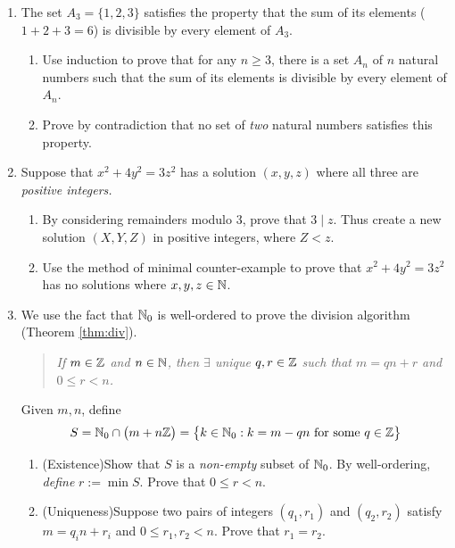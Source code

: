 \begin{exercises}
\begin{enumerate}
	
		\goodbreak
		
	
  	\item The set $A_3=\{1,2,3\}$ satisfies the property that the sum of its elements ($1+2+3=6$) is divisible by every element of $A_3$.
  	\begin{enumerate}
  	  \item Use induction to prove that for any $n\ge 3$, there is a set $A_n$ of $n$ natural numbers such that the sum of its elements is divisible by every element of $A_n$.
  	  \item Prove by contradiction that no set of \emph{two} natural numbers satisfies this property.
  	\end{enumerate}
 	
	
		\item Suppose that $x^2+4y^2=3z^2$ has a solution $(x,y,z)$ where all three are \emph{positive integers.}
		\begin{enumerate}
	  	\item By considering remainders modulo 3, prove that $3\mid z$. Thus create a new solution $(X,Y,Z)$ in positive integers, where $Z<z$.
	  	\item Use the method of minimal counter-example to prove that $x^2+4y^2=3z^2$ has no solutions where $x,y,z\in\mathbb{N}$.
		\end{enumerate}
  
	
		\item We use the fact that $\mathbb{N}_0$ is well-ordered to prove the division algorithm (Theorem \ref{thm:div}).
		\begin{quote}
			\emph{If $m\in\mathbb{Z}$ and $n\in\mathbb{N}$, then $\exists$ unique $q,r\in\mathbb{Z}$ such that $m=qn+r$ and $0\le r<n$.}
		\end{quote}
	
		Given $m,n$, define
		\[
			S=\mathbb{N}_0\cap\bigl(m+n\mathbb{Z}\bigr) =\bigl\{k\in\mathbb{N}_0:k=m-qn\text{ for some } q\in\mathbb{Z}\bigr\}
		\]	
		\begin{enumerate}
			\item (Existence)\lstsp Show that $S$ is a \emph{non-empty} subset of $\mathbb{N}_0$. By well-ordering, \emph{define} $r:=\min S$. Prove that $0\le r<n$.
			\item (Uniqueness)\lstsp Suppose two pairs of integers $(q_1,r_1)$ and $(q_2,r_2)$ satisfy $m=q_in+r_i$ and $0\le r_1,r_2<n$. Prove that $r_1=r_2$.
		\end{enumerate}
		

\end{enumerate}
\end{exercises}
